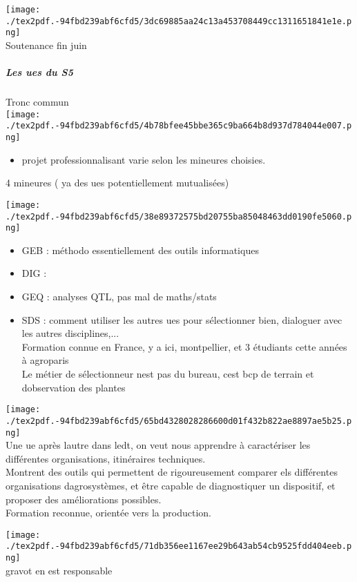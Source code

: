 \documentclass[
]{article}
\providecommand{\tightlist}{%
  \setlength{\itemsep}{0pt}\setlength{\parskip}{0pt}}
\begin{document}
\texttt{[image: ./tex2pdf.-94fbd239abf6cfd5/3dc69885aa24c13a453708449cc1311651841e1e.png]}\\
Soutenance fin juin

\hypertarget{les-ues-du-s5}{%
\subparagraph{Les ues du S5}\label{les-ues-du-s5}}

Tronc commun\\
\texttt{[image: ./tex2pdf.-94fbd239abf6cfd5/4b78bfee45bbe365c9ba664b8d937d784044e007.png]}

\begin{itemize}
\tightlist
\item
  projet professionnalisant varie selon les mineures choisies.
\end{itemize}

4 mineures ( ya des ues potentiellement mutualisées)

\texttt{[image: ./tex2pdf.-94fbd239abf6cfd5/38e89372575bd20755ba85048463dd0190fe5060.png]}

\begin{itemize}
\tightlist
\item
  GEB : méthodo essentiellement des outils informatiques
\item
  DIG :
\item
  GEQ : analyses QTL, pas mal de maths/stats
\item
  SDS : comment utiliser les autres ues pour sélectionner bien,
  dialoguer avec les autres disciplines,...\\
  Formation connue en France, y a ici, montpellier, et 3 étudiants cette
  années à agroparis\\
  Le métier de sélectionneur n\textquotesingle est pas du bureau,
  c\textquotesingle est bcp de terrain et d\textquotesingle observation
  des plantes
\end{itemize}

\texttt{[image: ./tex2pdf.-94fbd239abf6cfd5/65bd4328028286600d01f432b822ae8897ae5b25.png]}\\
Une ue après l\textquotesingle autre dans l\textquotesingle edt, on veut
nous apprendre à caractériser les différentes organisations, itinéraires
techniques.\\
Montrent des outils qui permettent de rigoureusement comparer els
différentes organisations d\textquotesingle agrosystèmes, et être
capable de diagnostiquer un dispositif, et proposer des améliorations
possibles.\\
Formation reconnue, orientée vers la production.

\texttt{[image: ./tex2pdf.-94fbd239abf6cfd5/71db356ee1167ee29b643ab54cb9525fdd404eeb.png]}\\
gravot en est responsable
\end{document}

